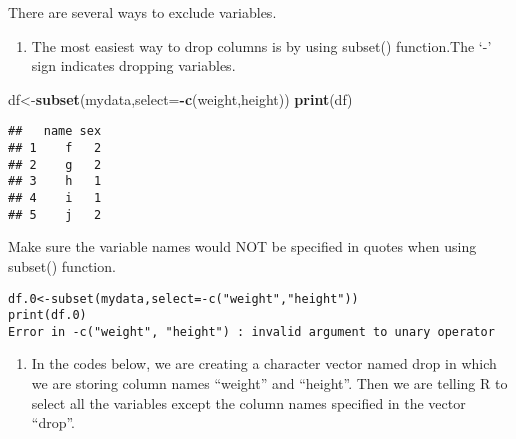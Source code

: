 \documentclass[]{book}
\newenvironment{Shaded}{\begin{snugshade}}{\end{snugshade}}
\newcommand{\KeywordTok}[1]{\textcolor[rgb]{0.13,0.29,0.53}{\textbf{#1}}}
\newcommand{\DataTypeTok}[1]{\textcolor[rgb]{0.13,0.29,0.53}{#1}}
\newcommand{\StringTok}[1]{\textcolor[rgb]{0.31,0.60,0.02}{#1}}
\newcommand{\CommentTok}[1]{\textcolor[rgb]{0.56,0.35,0.01}{\textit{#1}}}
\newcommand{\OperatorTok}[1]{\textcolor[rgb]{0.81,0.36,0.00}{\textbf{#1}}}
\newcommand{\NormalTok}[1]{#1}
\providecommand{\tightlist}{%
  \setlength{\itemsep}{0pt}\setlength{\parskip}{0pt}}
\theoremstyle{definition}
\theoremstyle{definition}
\theoremstyle{definition}
\theoremstyle{remark}
\begin{document}
There are several ways to exclude variables.

\begin{enumerate}
\def\labelenumi{(\arabic{enumi})}
\tightlist
\item
  The most easiest way to drop columns is by using subset() function.The
  `-' sign indicates dropping variables.
\end{enumerate}

\begin{Shaded}
\begin{Highlighting}[]
\NormalTok{df<-}\KeywordTok{subset}\NormalTok{(mydata,}\DataTypeTok{select=}\OperatorTok{-}\KeywordTok{c}\NormalTok{(weight,height))}
\KeywordTok{print}\NormalTok{(df)}
\end{Highlighting}
\end{Shaded}

\begin{verbatim}
##   name sex
## 1    f   2
## 2    g   2
## 3    h   1
## 4    i   1
## 5    j   2
\end{verbatim}

Make sure the variable names would NOT be specified in quotes when using
subset() function.

\begin{verbatim}
df.0<-subset(mydata,select=-c("weight","height"))
print(df.0)
Error in -c("weight", "height") : invalid argument to unary operator
\end{verbatim}

\begin{enumerate}
\def\labelenumi{(\arabic{enumi})}
\setcounter{enumi}{1}
\tightlist
\item
  In the codes below, we are creating a character vector named drop in
  which we are storing column names ``weight'' and ``height''. Then we
  are telling R to select all the variables except the column names
  specified in the vector ``drop''.
\end{enumerate}

\begin{Shaded}
\end{Shaded}
\end{document}
